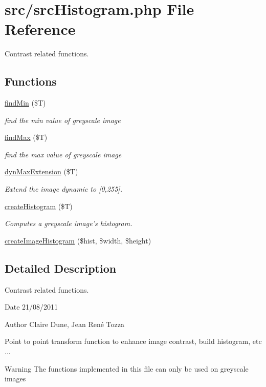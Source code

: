 \hypertarget{src_histogram_8php}{
\section{src/src\-Histogram.php \-File \-Reference}
\label{src_histogram_8php}
}


\-Contrast related functions.  


\subsection*{\-Functions}
\begin{DoxyCompactItemize}
\item 
\hyperlink{src_histogram_8php_a03f8c60ef2f085a805e407dc7020ddf2}{find\-Min} (\$\-T)
\begin{DoxyCompactList}\small\item\em find the min value of greyscale image \end{DoxyCompactList}\item 
\hyperlink{src_histogram_8php_aaae6af63d554a2bea15fab30485e85cb}{find\-Max} (\$\-T)
\begin{DoxyCompactList}\small\item\em find the max value of greyscale image \end{DoxyCompactList}\item 
\hyperlink{src_histogram_8php_ab63f175e4421f73e239f36cafaecc409}{dyn\-Max\-Extension} (\$\-T)
\begin{DoxyCompactList}\small\item\em \-Extend the image dynamic to \mbox{[}0,255\mbox{]}. \end{DoxyCompactList}\item 
\hyperlink{src_histogram_8php_a770cf55e1ef8ecf66b401d0dcec56193}{create\-Histogram} (\$\-T)
\begin{DoxyCompactList}\small\item\em \-Computes a greyscale image's histogram. \end{DoxyCompactList}\item 
\hyperlink{src_histogram_8php_a03d0ea8fe05bfea3306e36c47272d9ff}{create\-Image\-Histogram} (\$hist, \$width, \$height)
\end{DoxyCompactItemize}


\subsection{\-Detailed \-Description}
\-Contrast related functions. \begin{DoxyDate}{\-Date}
21/08/2011 
\end{DoxyDate}
\begin{DoxyAuthor}{\-Author}
\-Claire \-Dune, \-Jean \-René \-Tozza
\end{DoxyAuthor}
\-Point to point transform function to enhance image contrast, build histogram, etc ... \begin{DoxyWarning}{\-Warning}
\-The functions implemented in this file can only be used on greyscale images 
\end{DoxyWarning}


